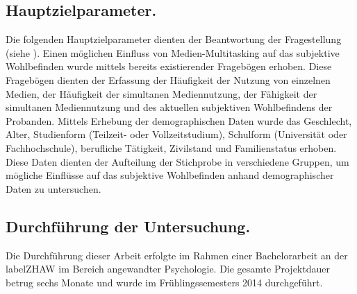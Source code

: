 \subsection{Hauptzielparameter.}\label{subsection.hauptzielparameter}
Die folgenden Hauptzielparameter dienten der Beantwortung der Fragestellung (siehe ). Einen möglichen Einfluss von Medien-Multitasking auf das subjektive Wohlbefinden wurde mittels bereits existierender Fragebögen erhoben. Diese Fragebögen dienten der Erfassung der Häufigkeit der Nutzung von einzelnen Medien, der Häufigkeit der simultanen Mediennutzung, der Fähigkeit der simultanen Mediennutzung und des aktuellen subjektiven Wohlbefindens der Probanden. Mittels Erhebung der demographischen Daten wurde das Geschlecht, Alter, Studienform (Teilzeit- oder Vollzeitstudium), Schulform (Universität oder Fachhochschule), berufliche Tätigkeit, Zivilstand und Familienstatus erhoben. Diese Daten dienten der Aufteilung der Stichprobe in verschiedene Gruppen, um mögliche Einflüsse auf das subjektive Wohlbefinden anhand demographischer Daten zu untersuchen.

\subsection{Durchführung der Untersuchung.}
Die Durchführung dieser Arbeit erfolgte im Rahmen einer Bachelorarbeit an der \gls{labelZHAW} im Bereich angewandter Psychologie. Die gesamte Projektdauer betrug sechs Monate und wurde im Frühlingssemesters 2014 durchgeführt.

